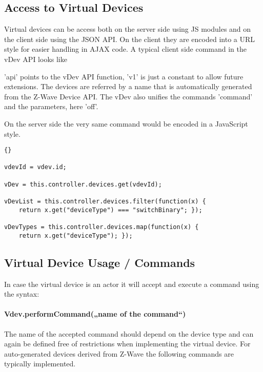  
\subsection{Access to Virtual Devices}

Virtual devices can be access both on the server side using JS modules and on the client 
side using the JSON API. On the client they are encoded into a URL style for easier 
handling  in AJAX code. A typical client side command in the vDev API looks like


'api' points to the vDev API function, 'v1' is just a constant to allow future extensions. 
The devices are referred by a name that is automatically generated from the Z-Wave 
Device API. The vDev also unifies the commands 'command' and the parameters, here 'off'.

On the server side the very same command would be encoded in a JavaScript style.

\begin{lstlisting}[caption=Access vDevs,basicstyle=\small,columns=fullflexible]{}

vdevId = vdev.id;

vDev = this.controller.devices.get(vdevId);

vDevList = this.controller.devices.filter(function(x) { 
	return x.get("deviceType") === "switchBinary"; }); 

vDevTypes = this.controller.devices.map(function(x) { 
	return x.get("deviceType"); }); 
\end{lstlisting}

\subsection{Virtual Device Usage / Commands}

In case the virtual device is an actor it will accept and execute a command using the 
syntax:

\paragraph{Vdev.performCommand(„name of the command“)}

The name of the accepted command should depend on the device type and can again be defined 
free of restrictions when implementing the virtual device. For auto-generated devices 
derived from Z-Wave the following commands are typically implemented.

